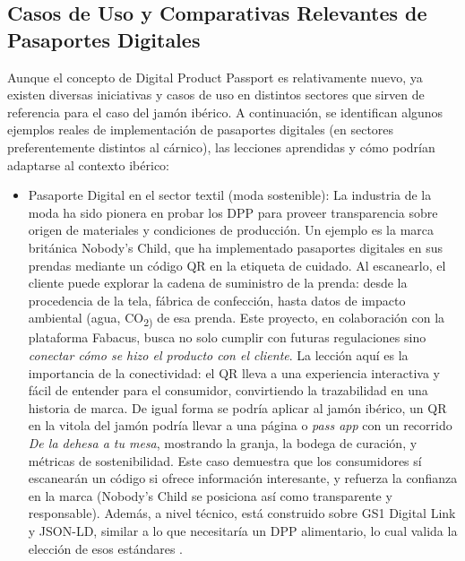 \subsection{Casos de Uso y Comparativas Relevantes de Pasaportes Digitales}\label{sec:intro-antecedentes}
Aunque el concepto de Digital Product Passport es relativamente nuevo, ya existen diversas iniciativas y casos de uso en distintos sectores que sirven de referencia para el caso del jamón ibérico. A continuación, se identifican algunos ejemplos reales de implementación de pasaportes digitales (en sectores preferentemente distintos al cárnico), las lecciones aprendidas y cómo podrían adaptarse al contexto ibérico:
\begin{itemize}
	\item Pasaporte Digital en el sector textil (moda sostenible): La industria de la moda ha sido pionera en probar los DPP para proveer transparencia sobre origen de materiales y condiciones de producción. Un ejemplo es la marca británica Nobody’s Child, que ha implementado pasaportes digitales en sus prendas mediante un código QR en la etiqueta de cuidado. Al escanearlo, el cliente puede explorar la cadena de suministro de la prenda: desde la procedencia de la tela, fábrica de confección, hasta datos de impacto ambiental (agua, CO\textsubscript{2)} de esa prenda. Este proyecto, en colaboración con la plataforma Fabacus, busca no solo cumplir con futuras regulaciones sino \textit{conectar cómo se hizo el producto con el cliente}. La lección aquí es la importancia de la conectividad: el QR lleva a una experiencia interactiva y fácil de entender para el consumidor, convirtiendo la trazabilidad en una historia de marca. De igual forma se podría aplicar al jamón ibérico, un QR en la vitola del jamón podría llevar a una página o \textit{pass app} con un recorrido \textit{De la dehesa a tu mesa}, mostrando la granja, la bodega de curación, y métricas de sostenibilidad. Este caso demuestra que los consumidores sí escanearán un código si ofrece información interesante, y refuerza la confianza en la marca (Nobody’s Child se posiciona así como transparente y responsable). Además, a nivel técnico, está construido sobre GS1 Digital Link y JSON-LD, similar a lo que necesitaría un DPP alimentario, lo cual valida la elección de esos estándares \cite{noauthor_10_nodate}.

\end{itemize}
